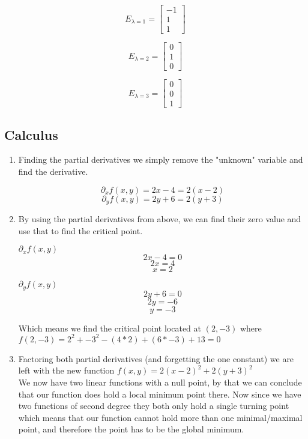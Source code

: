\documentclass[a4paper, 12pt]{article}
\newcommand{\mysubsection}[1]{\subsection*{#1} \addcontentsline{toc}{subsection}{#1}}
\begin{document}
{\begin{enumerate}
	\begin{minipage}[t]{0.3\textwidth}	
	\[
		E_{\lambda = 1} = \begin{bmatrix}
		-1 \\ 1 \\ 1
		\end{bmatrix}
	\]
	\end{minipage} \quad \vline \quad \begin{minipage}[t]{0.3\textwidth}	
	\[
		E_{\lambda = 2} = \begin{bmatrix}
		0 \\ 1 \\ 0
		\end{bmatrix}
	\]
	\end{minipage} \quad \vline \quad \begin{minipage}[t]{0.3\textwidth}	
	\[
		E_{\lambda = 3} = \begin{bmatrix}
		0 \\ 0 \\ 1
		\end{bmatrix}
	\]
	\end{minipage}
	
    \end{enumerate}
    }
    \newpage
    \mysubsection{Calculus}
    {
    \begin{enumerate}
    \item
    Finding the partial derivatives we simply remove the "unknown" variable and find the derivative.
    
    \[
    		{\partial}_x f(x,y) = 2x-4 = 2(x-2)
    \]
    \[
    		{\partial}_y f(x,y) = 2y+6 = 2(y+3)
    \]
    
    \item
    By using the partial derivatives from above, we can find their zero value and use that to find the critical point.
    
    \begin{minipage}[t]{0.5\textwidth}
	${\partial}_x f(x,y)$    
    \[
    		2x-4 = 0
    \]
    \[
    		2x = 4
    \]
    \[
    		x = 2
    \]
    \end{minipage} \quad \vline \quad \begin{minipage}[t]{0.5\textwidth}
	${\partial}_y f(x,y)$    
    \[
    		2y+6 = 0
    \]
    \[
    		2y = -6
    \]
    \[
    		y = -3
    \]    
    \end{minipage}

	Which means we find the critical point located at $(2,-3)$ where $f(2,-3) = 2^2 + -3^2 - (4*2) + (6*-3) + 13 = 0$ 
    
    \item
	Factoring both partial derivatives (and forgetting the one constant) we are left with the new function $f(x,y) = 2(x-2)^2 + 2(y+3)^2$\\
	
	We now have two linear functions with a null point, by that we can conclude that our function does hold a local minimum point there. Now since we have two functions of second degree they both only hold a single turning point which means that our function cannot hold more than one minimal/maximal point, and therefore the point has to be the global minimum.
	
    \end{enumerate}
    }
\end{document}
